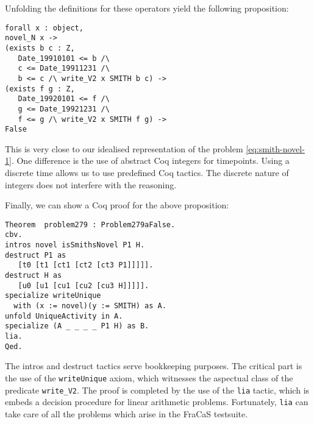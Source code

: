 \documentclass[a4paper,twoside]{article}
\begin{document}
Unfolding the definitions for these operators yield the following
proposition:
{\small
\begin{verbatim}
forall x : object,
novel_N x ->
(exists b c : Z,
   Date_19910101 <= b /\
   c <= Date_19911231 /\
   b <= c /\ write_V2 x SMITH b c) ->
(exists f g : Z,
   Date_19920101 <= f /\
   g <= Date_19921231 /\
   f <= g /\ write_V2 x SMITH f g) ->
False
\end{verbatim}
}This is very close to our idealised representation of the problem
\cref{eq:smith-novel-1}. One difference is the use of abstract Coq
integers for timepoints. Using a discrete time allows us to use
predefined Coq tactics. The discrete nature of integers does not
interfere with the reasoning.

Finally, we can show a Coq proof for the above proposition:
{\small
\begin{verbatim}
Theorem  problem279 : Problem279aFalse.
cbv.
intros novel isSmithsNovel P1 H.
destruct P1 as
   [t0 [t1 [ct1 [ct2 [ct3 P1]]]]].
destruct H as
   [u0 [u1 [cu1 [cu2 [cu3 H]]]]].
specialize writeUnique
  with (x := novel)(y := SMITH) as A.
unfold UniqueActivity in A.
specialize (A _ _ _ _ P1 H) as B.
lia.
Qed.
\end{verbatim}
}

The intros and destruct tactics serve bookkeeping purposes. The
critical part is the use of the \texttt{writeUnique} axiom, which
witnesses the aspectual class of the predicate \texttt{write\_V2}.
The proof is completed by the use of the \texttt{lia} tactic, which is
embeds a decision procedure for linear arithmetic
problems. Fortunately, \texttt{lia} can take care of all the problems
which arise in the FraCaS testsuite.
\end{document}
